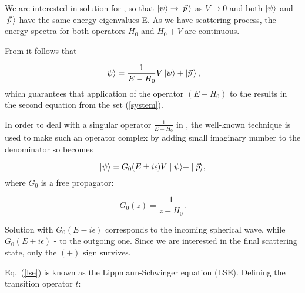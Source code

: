     We are interested in solution for , so that 
    $\ket{\psi} \rightarrow \ket{\vec{p}\,}$ as $V \rightarrow 0$
    and both $\ket{\psi}$ and $\ket{\vec{p}\,}$ have the same energy eigenvalues E.
    As we have scattering process, the energy spectra for both operators $H_0$ and $H_0 + V$
    are continuous. 

    From  it follows that

    \begin{equation}
        \ket{\psi} = \frac{1}{E - H_0}V \ket{\psi} +  \ket{\vec{p}\,},
        \label{psieq}
    \end{equation}
    which guarantees that
     application of the operator $(E -H_0)$ to the 
     results in the second equation from the set (\ref{system}).


    In order to deal with a singular operator $\frac{1}{E - H_0}$ in , the well-known
    technique is used to make such an operator complex by adding small imaginary number to the denominator
    so  becomes

    \begin{equation}
        \ket{\psi} = G_0(E \pm i\epsilon)V \mid \psi \rangle +  \mid \vec{p} \rangle,
        \label{lse}
    \end{equation}
    where $G_0$ is a free propagator:

    \begin{equation}
        G_0(z) = \frac{1}{z - H_0}.
        \label{g0}
    \end{equation}

    Solution with $G_0(E - i\epsilon)$ corresponds to the incoming spherical wave,
    while $G_0(E + i\epsilon)$ - to the outgoing one. Since we are interested in the final scattering
    state, only the $(+)$ sign survives.
    
    Eq.~(\ref{lse}) is known as the Lippmann-Schwinger equation (LSE).
    Defining the transition operator $t$:

